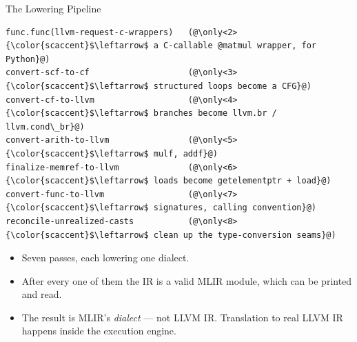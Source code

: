 \documentclass[aspectratio=169,10pt]{beamer}
\begin{document}
\begin{frame}[fragile]{The Lowering Pipeline}
\begin{lstlisting}[style=plain,basicstyle=\ttfamily\scriptsize]
func.func(llvm-request-c-wrappers)   (@\only<2>{\color{scaccent}$\leftarrow$ a C-callable @matmul wrapper, for Python}@)
convert-scf-to-cf                    (@\only<3>{\color{scaccent}$\leftarrow$ structured loops become a CFG}@)
convert-cf-to-llvm                   (@\only<4>{\color{scaccent}$\leftarrow$ branches become llvm.br / llvm.cond\_br}@)
convert-arith-to-llvm                (@\only<5>{\color{scaccent}$\leftarrow$ mulf, addf}@)
finalize-memref-to-llvm              (@\only<6>{\color{scaccent}$\leftarrow$ loads become getelementptr + load}@)
convert-func-to-llvm                 (@\only<7>{\color{scaccent}$\leftarrow$ signatures, calling convention}@)
reconcile-unrealized-casts           (@\only<8>{\color{scaccent}$\leftarrow$ clean up the type-conversion seams}@)
\end{lstlisting}
  \vspace{0.25em}
  \begin{itemize}
    \item<1-> Seven passes, each lowering \alert{one} dialect.
    \item<9-> After every one of them the IR is a valid MLIR module, which
      can be printed and read.
  \end{itemize}
  \begin{itemize}
    \item<10-> The result is MLIR's  \emph{dialect} --- not LLVM IR.
      Translation to real LLVM IR happens inside the execution engine.
  \end{itemize}
\end{frame}
\end{document}
